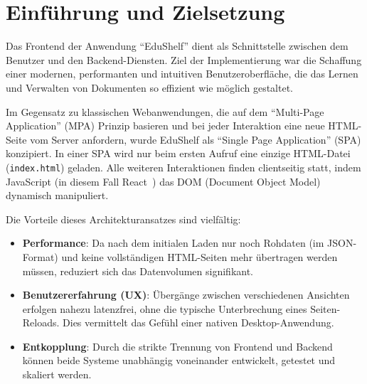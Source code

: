 \section{Einführung und Zielsetzung}
Das Frontend der Anwendung "`EduShelf"' dient als Schnittstelle zwischen dem Benutzer und den Backend-Diensten. Ziel der Implementierung war die Schaffung einer modernen, performanten und intuitiven Benutzeroberfläche, die das Lernen und Verwalten von Dokumenten so effizient wie möglich gestaltet.

Im Gegensatz zu klassischen Webanwendungen, die auf dem "`Multi-Page Application"' (MPA) Prinzip basieren und bei jeder Interaktion eine neue HTML-Seite vom Server anfordern, wurde EduShelf als "`Single Page Application"' (SPA) konzipiert. In einer SPA wird nur beim ersten Aufruf eine einzige HTML-Datei (\texttt{index.html}) geladen. Alle weiteren Interaktionen finden clientseitig statt, indem JavaScript (in diesem Fall React~\cite{ReactDocs}) das DOM (Document Object Model) dynamisch manipuliert.
\newline

Die Vorteile dieses Architekturansatzes sind vielfältig:
\begin{itemize}
    \item \textbf{Performance}: Da nach dem initialen Laden nur noch Rohdaten (im JSON-Format) und keine vollständigen HTML-Seiten mehr übertragen werden müssen, reduziert sich das Datenvolumen signifikant.
    \item \textbf{Benutzererfahrung (UX)}: Übergänge zwischen verschiedenen Ansichten erfolgen nahezu latenzfrei, ohne die typische Unterbrechung eines Seiten-Reloads. Dies vermittelt das Gefühl einer nativen Desktop-Anwendung.
    \item \textbf{Entkopplung}: Durch die strikte Trennung von Frontend und Backend können beide Systeme unabhängig voneinander entwickelt, getestet und skaliert werden.
\end{itemize}

